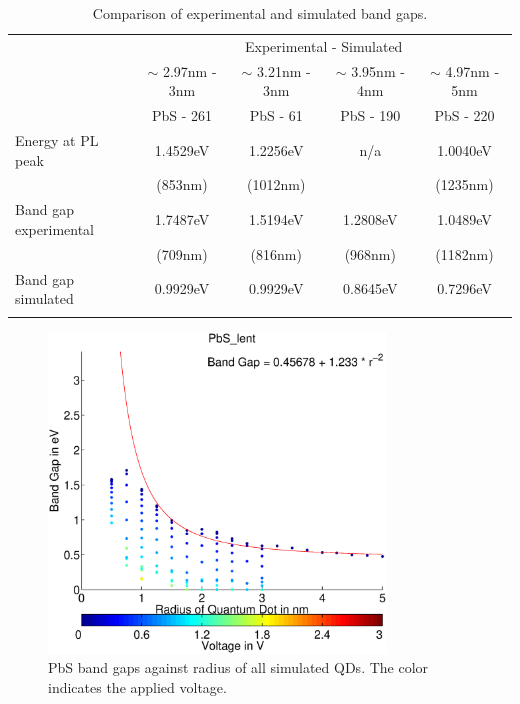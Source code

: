 	\begin{table}[t]
		\centering
		\begin{tabularx}{\textwidth}{Xc|c|c|c}
															& \multicolumn{4}{c}{Experimental \diameter - Simulated \diameter}														\\
															&	$\sim$ 2.97nm	- 3nm		&	$\sim$ 3.21nm - 3nm &	$\sim$ 3.95nm	-	4nm		&	$\sim$ 4.97nm - 5nm		\\
															&	PbS - 261				& PbS - 61						&	PbS - 190							&	PbS - 220							\\
			\hline
			Energy at \gls{PL} peak	&	1.4529eV 							&	1.2256eV 						&	n/a										&	1.0040eV 							\\
															&	(853nm)								&	(1012nm)						&												&	(1235nm)							\\
			Band gap experimental		&	1.7487eV 							&	1.5194eV 						&	1.2808eV 							&	1.0489eV 							\\
															&	(709nm)								&	(816nm)							&	(968nm)								&	(1182nm)							\\
			Band gap simulated			&	0.9929eV							&	0.9929eV						&	0.8645eV							&	0.7296eV							\\ \\
		\end{tabularx}
		\caption{Comparison of experimental and simulated band gaps.}
		\label{tbl:BandGap}
	\end{table}
	
	\begin{figure}[t]
		\centering
		\includegraphics[width=0.8\textwidth]{Fig/Plots/BandGap.eps}
		\caption{PbS band gaps against radius of all simulated \glspl{QD}. The color indicates the applied voltage.}
		\label{fig:BandGap}
	\end{figure}
	
